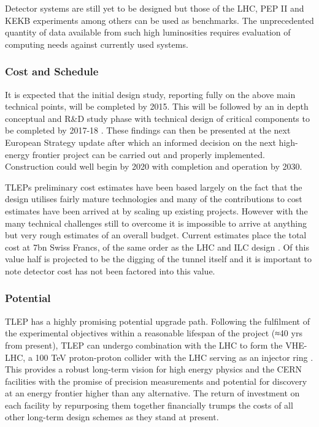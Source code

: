 Detector systems are still yet to be designed but those of the LHC, PEP II and KEKB experiments among others can be used as benchmarks. The unprecedented quantity of data available from such high luminosities requires evaluation of computing needs against currently used systems. 

\subsubsection{Cost and Schedule}

It is expected that the initial design study, reporting fully on the above main technical points, will be completed by 2015. This will be followed by an in depth conceptual and R\&D study phase with technical design of critical components to be completed by 2017-18 \cite{TLEP:CERNOverview}. These findings can then be presented at the next European Strategy update after which an informed decision on the next high-energy frontier project can be carried out and properly implemented. Construction could well begin by 2020 with completion and operation by 2030. 

TLEPs preliminary cost estimates have been based largely on the fact that the design utilises fairly mature technologies and many of the contributions to cost estimates have been arrived at by scaling up existing projects. However with the many technical challenges still to overcome it is impossible to arrive at anything but very rough estimates of an overall budget. Current estimates place the total cost at 7bn Swiss Francs, of the same order as the LHC and ILC design \cite{TLEP:Janot}. Of this value half is projected to be the digging of the tunnel itself and it is important to note detector cost has not been factored into this value.

\subsubsection{Potential}

TLEP has a highly promising potential upgrade path. Following the fulfilment of the experimental objectives within a reasonable lifespan of the project (≈40 yrs from present), TLEP can undergo combination with the LHC to form the VHE-LHC, a 100 TeV proton-proton collider with the LHC serving as an injector ring \cite{TLEP:Janot}. This provides a robust long-term vision for high energy physics and the CERN facilities with the promise of precision measurements and potential for discovery at an energy frontier higher than any alternative. The return of investment on each facility by repurposing them together financially trumps the costs of all other long-term design schemes as they stand at present.
